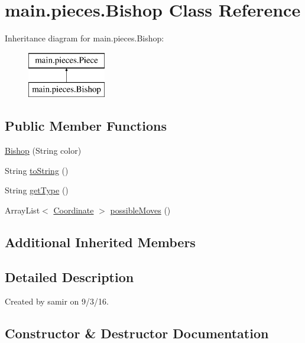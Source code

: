 \hypertarget{classmain_1_1pieces_1_1_bishop}{}\section{main.\+pieces.\+Bishop Class Reference}
\label{classmain_1_1pieces_1_1_bishop}
Inheritance diagram for main.\+pieces.\+Bishop\+:\begin{figure}[H]
\begin{center}
\leavevmode
\includegraphics[height=2.000000cm]{classmain_1_1pieces_1_1_bishop}
\end{center}
\end{figure}
\subsection*{Public Member Functions}
\begin{DoxyCompactItemize}
\item 
\hyperlink{classmain_1_1pieces_1_1_bishop_a14dd49999f0dd6d0d8fb96d9c09fbd8b}{Bishop} (String color)
\item 
String \hyperlink{classmain_1_1pieces_1_1_bishop_a6621662a277c0a45fb317b7d37612410}{to\+String} ()
\item 
String \hyperlink{classmain_1_1pieces_1_1_bishop_a99e4744c895f53d2d9c46c83a77be273}{get\+Type} ()
\item 
Array\+List$<$ \hyperlink{classmain_1_1model_1_1_coordinate}{Coordinate} $>$ \hyperlink{classmain_1_1pieces_1_1_bishop_a9abb24030574df6017a2f994125c5959}{possible\+Moves} ()
\end{DoxyCompactItemize}
\subsection*{Additional Inherited Members}


\subsection{Detailed Description}
Created by samir on 9/3/16. 

\subsection{Constructor \& Destructor Documentation}
\hypertarget{classmain_1_1pieces_1_1_bishop_a14dd49999f0dd6d0d8fb96d9c09fbd8b}{}\label{classmain_1_1pieces_1_1_bishop_a14dd49999f0dd6d0d8fb96d9c09fbd8b} 
